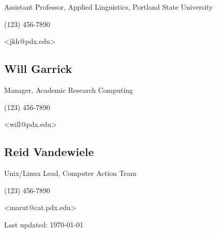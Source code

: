 \documentclass[10pt,letterpaper]{article}
\renewenvironment{itemize}{
  \begin{list}{}{
    \setlength{\leftmargin}{1.5em}
    \setlength{\itemsep}{0em}
    \setlength{\parskip}{0pt}
    \setlength{\parsep}{0em}
  }
}{
  \end{list}
}
\begin{document}
\begin{itemize}
	
	\item Assistant Professor, Applied Linguistics, Portland State University
	\item (123) 456-7890
	\item <jkh@pdx.edu>
	
\end{itemize}

\subsection*{Will Garrick}

\begin{itemize}
	
	\item Manager, Academic Research Computing
	\item (123) 456-7890
	\item <will@pdx.edu>	
	
\end{itemize}

\subsection*{Reid Vandewiele}

\begin{itemize}
	
	\item Unix/Linux Lead, Computer Action Team
	\item (123) 456-7890
	\item <marut@cat.pdx.edu>	
	
\end{itemize}

\bigskip

\begin{center}
  \begin{small}
    Last updated: \today
  \end{small}
\end{center}
\end{document}
